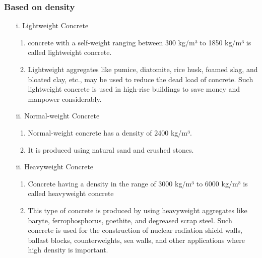 \documentclass[a4paper,11pt]{book}
\begin{document}
\subsubsection{Based on density}
\begin{enumerate}
    \item[i.] Lightweight Concrete
    \begin{enumerate}
            \item concrete with a self-weight ranging between 300 kg/m³ to 1850 kg/m³ is called lightweight concrete.
            \item Lightweight aggregates like pumice, diatomite, rice husk, foamed slag, and bloated clay, etc., may be used to reduce the dead load of concrete. Such lightweight concrete is used in high-rise buildings to save money and manpower considerably.
        \end{enumerate}
    \item[ii.] Normal-weight Concrete
    \begin{enumerate}
            \item Normal-weight concrete has a density of 2400 kg/m³.
            \item It is produced using natural sand and crushed stones.
        \end{enumerate}
        \item[ii.] Heavyweight Concrete
    \begin{enumerate}
            \item Concrete having a density in the range of 3000 kg/m³ to 6000 kg/m³ is called heavyweight concrete
            \item This type of concrete is produced by using heavyweight aggregates like baryte, ferrophosphorus, goethite, and degreased scrap steel. Such concrete is used for the construction of nuclear radiation shield walls, ballast blocks, counterweights, sea walls, and other applications where high density is important.
        \end{enumerate}
\end{enumerate}   
\end{document}
